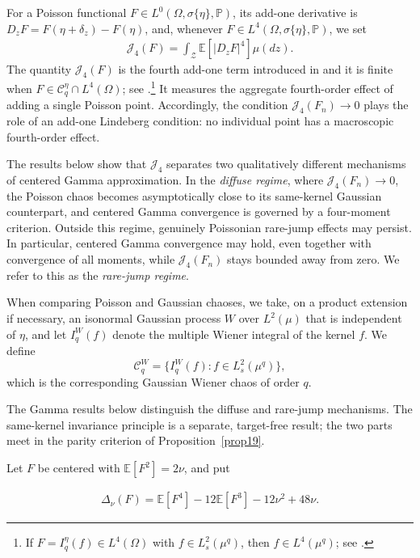 \documentclass[letterpaper,11pt,reqno]{amsart}
\numberwithin{equation}{section}
\theoremstyle{plain}
\theoremstyle{definition}
\theoremstyle{remark}
\newcommand{\E}{\mathbb{E}}
\newcommand{\PP}{\mathbb{P}}
\newcommand{\cC}{\mathcal{C}}
\newcommand{\cZ}{\mathcal{Z}}
\newcommand{\noi}{\noindent}
\newcommand{\dd}{d}
\newcommand{\Jfour}{\mathcal J_4}
\newcommand{\Del}{\Delta}
\newcommand{\s}{\sigma}
\begin{document}
For a Poisson functional $F\in L^0(\Omega,\s\{\eta\},\PP)$,
its add-one derivative is
$D_zF=F(\eta+\delta_z)-F(\eta)$,
and, whenever $F\in L^4(\Omega, \s\{\eta\}, \PP)$, we set
\begin{align} \label{J4F}
\Jfour(F)
=
\int_\cZ\E[|D_zF|^4]\mu(\dd z).
\end{align}
The quantity $\Jfour(F)$ is the fourth add-one term introduced in
\cite{DP18b}
and it is finite when $F\in\cC_q^\eta\cap L^4(\Omega)$;
see \cite[Theorem~1.8]{Zhe26a}.\footnote{If
$F=I_q^\eta(f)\in L^4(\Omega)$ with $f\in L_s^2(\mu^q)$, then
$f\in L^4(\mu^q)$; see \cite[(1.12)]{Zhe26a}.}
It measures the aggregate fourth-order effect of adding
a single Poisson point.  Accordingly, the condition
$\Jfour(F_n)\to0$ plays the role of an add-one Lindeberg condition: no
individual point has a macroscopic fourth-order effect.

The results below show that $\Jfour$ separates two qualitatively
different mechanisms of centered Gamma approximation.  In the
\emph{diffuse regime}, where $\Jfour(F_n)\to0$, the Poisson chaos
becomes asymptotically close to its same-kernel Gaussian counterpart,
and centered Gamma convergence is governed by a four-moment
criterion.  Outside this regime, genuinely Poissonian rare-jump
effects may persist.  In particular, centered Gamma convergence may
hold, even together with convergence of all moments, while
$\Jfour(F_n)$ stays bounded away from zero.  We refer to this as the
\emph{rare-jump regime}.





When comparing Poisson and Gaussian chaoses, we take, on a product
extension if necessary, an isonormal Gaussian process $W$ over
$L^2(\mu)$ that is independent of $\eta$, and let $I_q^W(f)$ denote
the multiple Wiener integral of the kernel $f$.  We define
\[
\cC_q^W
=
\{I_q^W(f):f\in L_s^2(\mu^q)\},
\]
which is the corresponding Gaussian Wiener chaos of order $q$.

The Gamma results below distinguish the diffuse and rare-jump
mechanisms.  The same-kernel invariance principle is a separate,
target-free result; the two parts meet in the parity criterion of
Proposition~\ref{prop19}.

Let $F$ be centered with $\E[F^2]=2\nu$, and put

\noi
\begin{align}
 \Del_\nu(F)
 =\E[F^4]-12\E[F^3]-12\nu^2+48\nu.
 \label{intro_Del}
\end{align}
\end{document}
